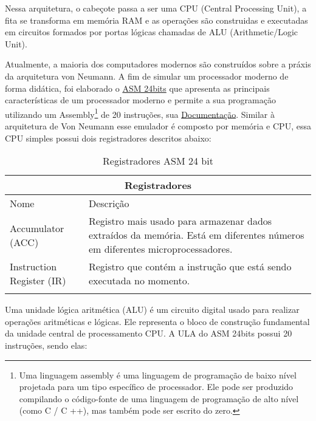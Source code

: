 Nessa arquitetura, o cabeçote passa a ser uma CPU (Central Processing Unit), a fita se transforma em memória RAM e as operações são construidas e executadas em circuitos formados por portas lógicas chamadas de ALU (Arithmetic/Logic Unit). \cite{12}

Atualmente, a maioria dos computadores modernos são construídos sobre a práxis da arquitetura von Neumann. A fim de simular um processador moderno de forma didática, foi elaborado o \href{https://gzsig.io/vm-24bits/}{ASM 24bits} que apresenta as principais características de um processador moderno e permite a sua programação utilizando um Assembly\footnote{Uma linguagem assembly é uma linguagem de programação de baixo nível projetada para um tipo específico de processador. Ele pode ser produzido compilando o código-fonte de uma linguagem de programação de alto nível (como C / C ++), mas também pode ser escrito do zero.} de 20 instruções, sua \href{https://github.com/gzsig/Asm/blob/master/README.md}{Documentação}. Similar à arquitetura de Von Neumann esse emulador é composto por memória e CPU, essa CPU simples possui dois registradores descritos abaixo:

\vspace{1cm}
\begin{longtable}{ |p{3cm}||p{11cm}|  }
  \hline
  \multicolumn{2}{|c|}{Registradores} \\
  \hline
    Nome &
    Descrição\\
  \hline
    Accumulator (ACC) &
    Registro mais usado para armazenar dados extraídos da memória. Está em diferentes números em diferentes microprocessadores. \\
  \hline
    Instruction Register (IR) &
    Registro que contém a instrução que está sendo executada no momento. \\
  \hline
  \caption{Registradores ASM 24 bit}
  \label{table:1}
\end{longtable}
\vspace{1cm}

Uma unidade lógica aritmética (ALU) é um circuito digital usado para realizar operações aritméticas e lógicas. Ele representa o bloco de construção fundamental da unidade central de processamento CPU. A ULA do ASM 24bits possui 20 instruções, sendo elas:

